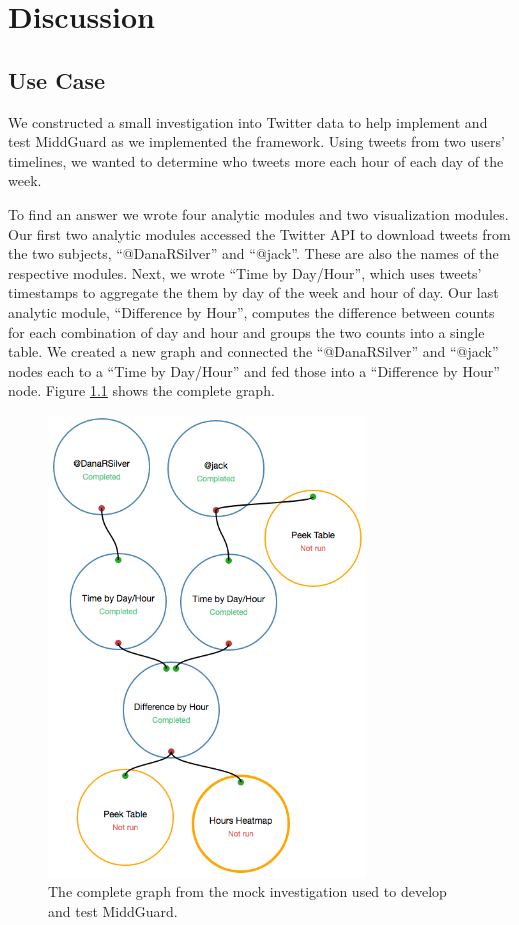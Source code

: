 \documentclass[midd]{thesis}
\begin{document}
\chapter{Discussion}

\section{Use Case}

We constructed a small investigation into Twitter data to help implement and
test MiddGuard as we implemented the framework. Using tweets from two users'
timelines, we wanted to determine who tweets more each hour of each day of the
week.

To find an answer we wrote four analytic modules and two visualization modules.
Our first two analytic modules accessed the Twitter API to download tweets from
the two subjects, ``@DanaRSilver'' and ``@jack''. These are also the names of
the respective modules. Next, we wrote ``Time by Day/Hour'', which uses tweets'
timestamps to aggregate the them by day of the week and hour of day. Our last
analytic module, ``Difference by Hour'', computes the difference between counts
for each combination of day and hour and groups the two counts into a single
table. We created a new graph and connected the ``@DanaRSilver'' and
``@jack'' nodes each to a ``Time by Day/Hour'' and fed those into a ``Difference
by Hour'' node. Figure \ref{fig:tweetanalysisgraph} shows the complete graph.

\begin{figure}[!ht]
  \centering
  \includegraphics[width=0.75\textwidth]{tweetanalysisgraph}
  \caption[The complete graph from a use case.]{The complete graph from the mock
  investigation used to develop and test MiddGuard.}
  \label{fig:tweetanalysisgraph}
\end{figure}
\end{document}
